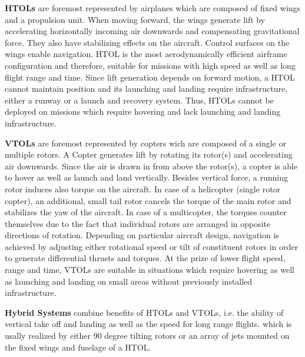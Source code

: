 \textbf{HTOLs}
are foremost represented by airplanes
which are composed of fixed wings
and a propulsion unit.
When moving forward, the wings
generate lift 
by accelerating horizontally incoming
air downwards and compensating
gravitational force.
They also have stabilizing effects
on the aircraft.
Control surfaces on the wings
enable navigation.
HTOL is
the most aerodynamically efficient airframe configuration
and therefore, suitable for missions
with high speed as well as
long flight range and time.
Since lift generation depends on forward motion,
a HTOL cannot maintain position and
its launching and landing 
require infrastructure, either a runway or
a launch and recovery system.
Thus, HTOLs cannot be deployed
on missions
which require hovering and lack
launching and landing infrastructure.

\textbf{VTOLs}
are foremost represented by
copters wich are composed of a single or multiple rotors.
A Copter generates lift by rotating its rotor(s)
and accelerating air downwards.
Since the air is drawn in from above the rotor(s),
a copter is able to hover as well as launch and land vertically.
Besides vertical force,
a running rotor induces also torque
on the aircraft.
In case of a helicopter (single rotor copter),
an additional, small tail rotor
cancels the torque of the main rotor and 
stabilizes the yaw of the aircraft.
In case of a multicopter,
the torques counter themselves
due to the fact that individual rotors
are arranged in opposite directions of rotation.
Depending on particular aircraft design, 
navigation is achieved by
adjusting either rotational speed 
or tilt of constituent rotors
in order to
generate differential thrusts and torques.
At the prize of lower flight speed, range and time,
VTOLs are suitable in situations which
require hovering as well as launching and landing on small areas 
without previously installed infrastructure.

\textbf{Hybrid Systems}
combine benefits of HTOLs and VTOLs,
i.e. the ability of vertical take off and landing
as well as the speed for 
long range flights.
which is usally realized by
either 90 degree tilting rotors or
an array of jets mounted on 
the fixed wings and fuselage of a HTOL.

